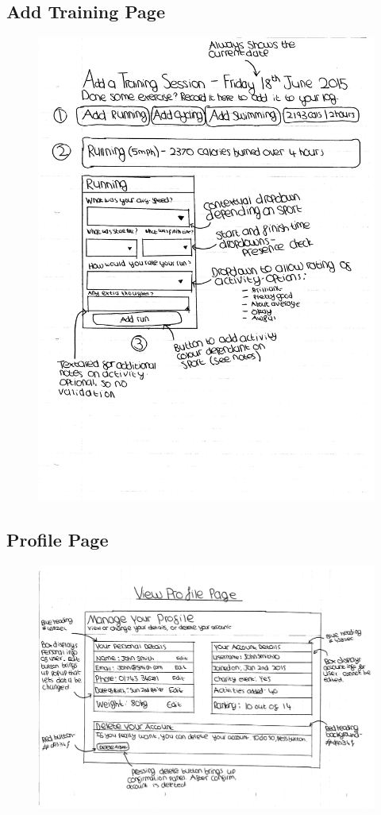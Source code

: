 \documentclass{article}[12pt,a4paper]
\begin{document}
\subsection{Add Training Page}
\begin{figure}[h!]
  \includegraphics[scale=0.55]{design_ui/add_training}
\end{figure}
\clearpage

\subsection{Profile Page}
\begin{figure}[h!]
  \includegraphics[scale=0.55]{design_ui/profile}
\end{figure}
\clearpage
\end{document}
